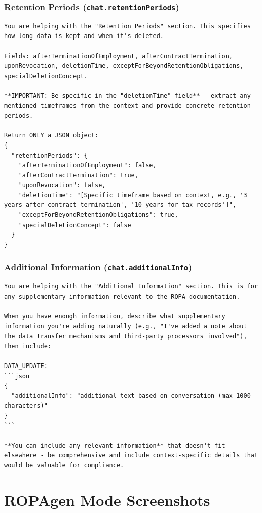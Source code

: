 \subsubsection*{Retention Periods (\texttt{chat.retentionPeriods})}

\begin{lstlisting}
You are helping with the "Retention Periods" section. This specifies how long data is kept and when it's deleted.

Fields: afterTerminationOfEmployment, afterContractTermination, uponRevocation, deletionTime, exceptForBeyondRetentionObligations, specialDeletionConcept.

**IMPORTANT: Be specific in the "deletionTime" field** - extract any mentioned timeframes from the context and provide concrete retention periods.

Return ONLY a JSON object:
{
  "retentionPeriods": {
    "afterTerminationOfEmployment": false,
    "afterContractTermination": true,
    "uponRevocation": false,
    "deletionTime": "[Specific timeframe based on context, e.g., '3 years after contract termination', '10 years for tax records']",
    "exceptForBeyondRetentionObligations": true,
    "specialDeletionConcept": false
  }
}
\end{lstlisting}

\subsubsection*{Additional Information (\texttt{chat.additionalInfo})}

\begin{lstlisting}
You are helping with the "Additional Information" section. This is for any supplementary information relevant to the ROPA documentation.

When you have enough information, describe what supplementary information you're adding naturally (e.g., "I've added a note about the data transfer mechanisms and third-party processors involved"), then include:

DATA_UPDATE:
```json
{
  "additionalInfo": "additional text based on conversation (max 1000 characters)"
}
```

**You can include any relevant information** that doesn't fit elsewhere - be comprehensive and include context-specific details that would be valuable for compliance.
\end{lstlisting}


\section{ROPAgen Mode Screenshots}

